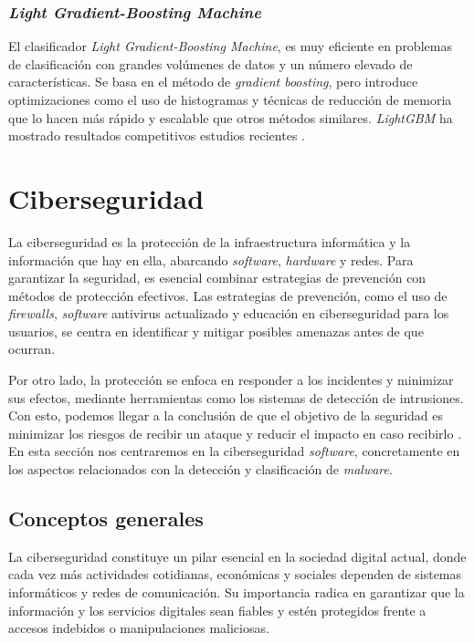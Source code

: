 \subsubsection{\textit{Light Gradient-Boosting Machine}}
\label{subsubsec:lgbm}

El clasificador \textit{Light Gradient-Boosting Machine}, es muy eficiente en problemas de clasificación con grandes volúmenes de datos y un número elevado de características. Se basa en el método de \textit{gradient boosting}, pero introduce optimizaciones como el uso de histogramas y técnicas de reducción de memoria que lo hacen más rápido y escalable que otros métodos similares. \textit{LightGBM} ha mostrado resultados competitivos estudios recientes \cite{estudio_lgbm}.

\section{Ciberseguridad}
\label{sec:ciberseguridad}

La ciberseguridad es la protección de la infraestructura informática y la información que hay en ella, abarcando \textit{software}, \textit{hardware} y redes. Para garantizar la seguridad, es esencial combinar estrategias de prevención con métodos de protección efectivos. Las estrategias de prevención, como el uso de \textit{firewalls}, \textit{software} antivirus actualizado y educación en ciberseguridad para los usuarios, se centra en identificar y mitigar posibles amenazas antes de que ocurran.

\vspace{1em}

Por otro lado, la protección se enfoca en responder a los incidentes y minimizar sus efectos, mediante herramientas como los sistemas de detección de intrusiones. Con esto, podemos llegar a la conclusión de que el objetivo de la seguridad es minimizar los riesgos de recibir un ataque y reducir el impacto en caso recibirlo \cite{ciberseguridad_def}. En esta sección nos centraremos en la ciberseguridad \textit{software}, concretamente en los aspectos relacionados con la detección y clasificación de \textit{malware}.

\subsection{Conceptos generales}
\label{subsec:ciberseguridad_general}

La ciberseguridad constituye un pilar esencial en la sociedad digital actual, donde cada vez más actividades cotidianas, económicas y sociales dependen de sistemas informáticos y redes de comunicación. Su importancia radica en garantizar que la información y los servicios digitales sean fiables y estén protegidos frente a accesos indebidos o manipulaciones maliciosas.


